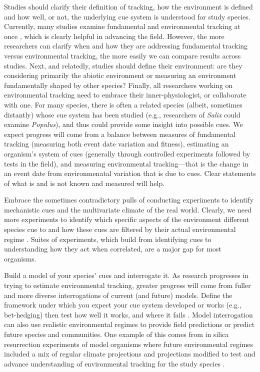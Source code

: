 \documentclass[11pt,letterpaper]{article}
\newcommand{\R}[1]{\label{#1}\linelabel{#1}}
\begin{document}
Studies should clarify their definition of tracking, how the environment is defined and how well, or not, the underlying cue system is understood for study species. Currently, many studies examine fundamental and environmental tracking at once \R{r3misc6}\citep[e.g.,][]{visser2006,charm2008,Cleland:2012,yang2020}, which is clearly helpful in advancing the field. However, the more researchers can clarify when and how they are addressing fundamental tracking versus environmental tracking, the more easily we can compare results across studies. Next, and relatedly, studies should define their environment: are they considering primarily the abiotic environment or measuring an environment fundamentally shaped by other species? Finally, all researchers working on environmental tracking need to embrace their inner-physiologist, or collaborate with one. \R{r3misc6S}For many species, there is often a related species (albeit, sometimes distantly) whose cue system has been studied (e.g., researchers of \emph{Salix} could examine \emph{Populus}), and thus could provide some insight into possible cues.\R{r3misc6E} We expect progress will come from a balance between measures of fundamental tracking (measuring both event date variation and fitness), estimating an organism's system of cues (generally through controlled experiments followed by tests in the field), and measuring environmental tracking---that is the change in an event date from environmenatal variation that is due to cues. \R{r4miscvague} Clear statements of what is and is not known and measured will help. 

Embrace the sometimes contradictory pulls of conducting experiments to identify mechanistic cues and the multivariate climate of the real world. Clearly, we need more experiments to identify which specific aspects of the environment different species cue to and how these cues are filtered by their actual environmental regime \citep[as outlined above and see][]{chmura2019}. Suites of experiments, which build from identifying cues to understanding how they act when correlated, are a major gap for most organisms. 

Build a model of your species' cues and interrogate it. As research progresses in trying to estimate environmental tracking, greater progress will come from fuller and more diverse interrogations of current (and future) models. Define the framework under which you expect your cue system developed or works (e.g., bet-hedging) then test how well it works, and where it fails \citep[see][for an example]{johanOCR}. Model interrogation can also use realistic environmental regimes to provide field predictions \citep{Wilczek:2010ad,Wilczek:2009oa} or predict future species and communities. One example of this comes from in silica resurrection experiments of model organisms where future environmental regimes included a mix of regular climate projections and projections modified to test and advance understanding of environmental tracking for the study species \citep[e.g., warmer winter and altered photoperiod scenarios in][]{fournier2016}.\\
\end{document}
